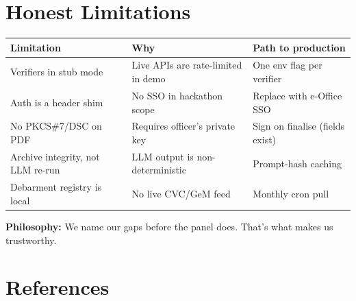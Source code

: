 \documentclass[11pt,a4paper]{article}
\begin{document}
\section{Honest Limitations}

\begin{center}
\begin{tabular}{p{4cm}p{4cm}p{5cm}}
\toprule
\textbf{Limitation} & \textbf{Why} & \textbf{Path to production} \\
\midrule
Verifiers in stub mode & Live APIs are rate-limited in demo & One env flag per verifier \\
Auth is a header shim & No SSO in hackathon scope & Replace with e-Office SSO \\
No PKCS\#7/DSC on PDF & Requires officer's private key & Sign on finalise (fields exist) \\
Archive integrity, not LLM re-run & LLM output is non-deterministic & Prompt-hash caching \\
Debarment registry is local & No live CVC/GeM feed & Monthly cron pull \\
\bottomrule
\end{tabular}
\end{center}

\textbf{Philosophy:} We name our gaps before the panel does. That's what makes us trustworthy.

\section{References}
\end{document}
